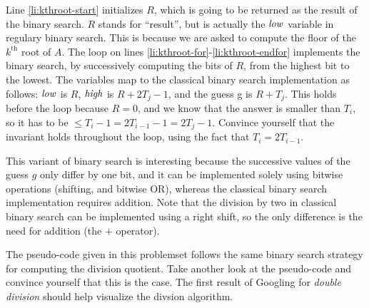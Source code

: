 \documentclass[12pt,twoside]{article}
\begin{document}
\begin{problems}
\begin{problemparts}
{  Line \ref{li:kthroot-start} initializes $R$, which is going to be returned as
  the result of the binary search. $R$ stands for ``result'', but is actually
  the $\id{low}$ variable in regulary binary search. This is because we are
  asked to compute the floor of the $k^\textrm{th}$ root of $A$. The 
  loop on lines \ref{li:kthroot-for}-\ref{li:kthroot-endfor} implements the
  binary search, by successively computing the bits of $R$, from the highest
  bit to the lowest. The variables map to the classical binary search
  implementation as follows: $\id{low}$ is $R$, $\id{high}$ is $R + 2 T_j
  - 1$, and the guess g is $R + T_j$. This holds before the loop because $R =
  0$, and we know that the answer is smaller than $T_i$, so it has to be $\le
  T_i - 1 = 2 T_{i - 1} - 1 = 2 T_j - 1$. Convince yourself that the invariant
  holds throughout the loop, using the fact that $T_i = 2 T_{i - 1}$.
  
  This variant of binary search is interesting because the successive values of
  the guess $g$ only differ by one bit, and it can be implemented solely using
  bitwise operations (shifting, and bitwise OR), whereas the classical binary
  search implementation requires addition. Note that the division by two in
  classical binary search can be implemented using a right shift, so the only
  difference is the need for addition (the $+$ operator).
  
  The  pseudo-code given in this problemset follows the same binary
  search strategy for computing the division quotient. Take another look at the
  pseudo-code and convince yourself that this is the case. The first
  result of Googling for \textit{double division} should help visualize the
  divsion algorithm.
  
}
\end{problemparts}
\end{problems}
\end{document}
